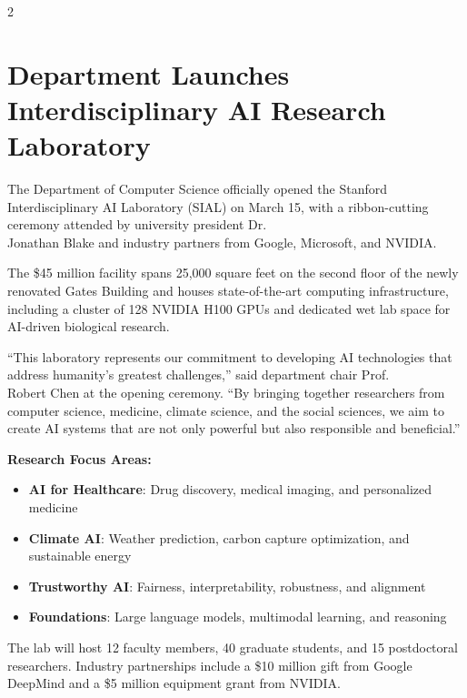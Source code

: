 \documentclass[10pt,a4paper]{article}
\begin{document}
\begin{multicols}{2}

\section{Department Launches Interdisciplinary AI Research Laboratory}

The Department of Computer Science officially opened the Stanford Interdisciplinary AI Laboratory (SIAL) on March 15, with a ribbon-cutting ceremony attended by university president Dr.\\ Jonathan Blake and industry partners from Google, Microsoft, and NVIDIA.

The \$45 million facility spans 25,000 square feet on the second floor of the newly renovated Gates Building and houses state-of-the-art computing infrastructure, including a cluster of 128 NVIDIA H100 GPUs and dedicated wet lab space for AI-driven biological research.

``This laboratory represents our commitment to developing AI technologies that address humanity's greatest challenges,'' said department chair Prof.\\ Robert Chen at the opening ceremony. ``By bringing together researchers from computer science, medicine, climate science, and the social sciences, we aim to create AI systems that are not only powerful but also responsible and beneficial.''

\textbf{Research Focus Areas:}
\begin{itemize}[leftmargin=1.2em, nosep, itemsep=2pt]
  \item \textbf{AI for Healthcare}: Drug discovery, medical imaging, and personalized medicine
  \item \textbf{Climate AI}: Weather prediction, carbon capture optimization, and sustainable energy
  \item \textbf{Trustworthy AI}: Fairness, interpretability, robustness, and alignment
  \item \textbf{Foundations}: Large language models, multimodal learning, and reasoning
\end{itemize}

The lab will host 12 faculty members, 40 graduate students, and 15 postdoctoral researchers. Industry partnerships include a \$10 million gift from Google DeepMind and a \$5 million equipment grant from NVIDIA.


\end{multicols}
\end{document}
